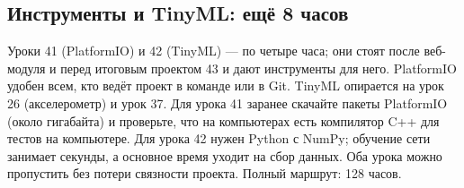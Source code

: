 \subsection*{Инструменты и TinyML: ещё 8 часов}
Уроки 41 (PlatformIO) и 42 (TinyML) --- по четыре часа; они стоят после веб-модуля и перед итоговым проектом 43
и дают инструменты для него. PlatformIO удобен всем, кто ведёт проект в команде или в Git.
TinyML опирается на урок 26 (акселерометр) и урок 37. Для урока 41 заранее скачайте пакеты PlatformIO
(около гигабайта) и проверьте, что на компьютерах есть компилятор C++ для тестов на компьютере.
Для урока 42 нужен Python с NumPy; обучение сети занимает секунды, а основное время уходит на сбор данных.
Оба урока можно пропустить без потери связности проекта. Полный маршрут: 128 часов.
